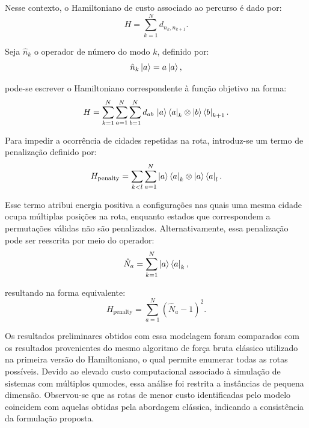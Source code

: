 
Nesse contexto, o Hamiltoniano de custo associado ao percurso é dado por:
$$
H = \sum_{k=1}^N d_{n_k, n_{k+1}}.
$$

Seja $\hat{n}_k$ o operador de número do modo $k$, definido por:
$$
\hat{n}_k\ket{a} = a\ket{a},
$$

\noindent pode-se escrever o Hamiltoniano correspondente à função objetivo na forma:
$$
H = \sum_{k=1}^N \sum_{a=1}^N \sum_{b=1}^N d_{ab}\, \ket{a}\bra{a}_k \otimes \ket{b}\bra{b}_{k+1}.
$$

Para impedir a ocorrência de cidades repetidas na rota, introduz-se um termo de penalização definido por:
$$
H_{\text{penalty}} = \sum_{k<l} \sum_{a=1}^N \ket{a}\bra{a}_k \otimes \ket{a}\bra{a}_l.
$$

Esse termo atribui energia positiva a configurações nas quais uma mesma cidade ocupa múltiplas posições na rota, enquanto estados que correspondem a permutações válidas não são penalizados. Alternativamente, essa penalização pode ser reescrita por meio do operador:
$$
\hat{N}_a = \sum_{k=1}^N \ket{a}\bra{a}_k,
$$

\noindent resultando na forma equivalente:
$$
H_{\text{penalty}} = \sum_{a=1}^N \left(\hat{N}_a - 1 \right)^2.
$$

Os resultados preliminares obtidos com essa modelagem foram comparados com os resultados provenientes do mesmo algoritmo de força bruta clássico utilizado na primeira versão do Hamiltoniano, o qual permite enumerar todas as rotas possíveis. Devido ao elevado custo computacional associado à simulação de sistemas com múltiplos qumodes, essa análise foi restrita a instâncias de pequena dimensão. Observou-se que as rotas de menor custo identificadas pelo modelo coincidem com aquelas obtidas pela abordagem clássica, indicando a consistência da formulação proposta.


